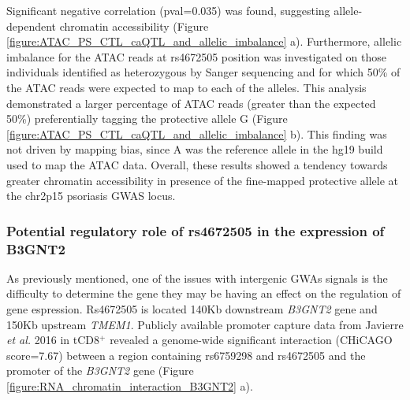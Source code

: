 


Significant negative correlation (pval=0.035) was found, suggesting allele-dependent chromatin accessibility (Figure \ref{figure:ATAC_PS_CTL_caQTL_and_allelic_imbalance} a). Furthermore, allelic imbalance for the ATAC reads at rs4672505 position was investigated on those individuals identified as heterozygous by Sanger sequencing and for which 50\% of the ATAC reads were expected to map to each of the alleles. This analysis demonstrated a larger percentage of ATAC reads (greater than the expected 50\%) preferentially tagging the protective allele G (Figure \ref{figure:ATAC_PS_CTL_caQTL_and_allelic_imbalance} b). This finding was not driven by mapping bias, since A was the reference allele in the hg19 build used to map the ATAC data. Overall, these results showed a tendency towards greater chromatin accessibility in presence of the fine-mapped protective allele at the chr2p15 psoriasis GWAS locus.
 

\subsubsection{Potential regulatory role of rs4672505 in the expression of B3GNT2}
As previously mentioned, one of the issues with intergenic GWAs signals is the difficulty to determine the gene they may be having an effect on the regulation of gene espression. Rs4672505 is located 140Kb downstream \textit{B3GNT2} gene and 150Kb upstream \textit{TMEM1}. Publicly available promoter capture data from Javierre \textit{et al.} 2016 in tCD8$^+$ revealed a genome-wide significant interaction (CHiCAGO score=7.67) between a region containing rs6759298 and rs4672505 and the promoter of the \textit{B3GNT2} gene (Figure \ref{figure:RNA_chromatin_interaction_B3GNT2} a). 

